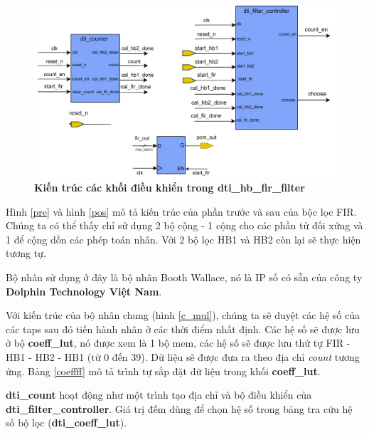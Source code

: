 \begin{figure}[H]
    \centering
    \includegraphics[width=13cm]{Images/Chuong4/hb_fir/fir.png}
    \caption[Kiến trúc các khối điều khiển trong dti\_hb\_fir\_filter]{\bfseries \fontsize{12pt}{0pt}\selectfont Kiến trúc các khối điều khiển trong dti\_hb\_fir\_filter}
    \label{control}
\end{figure}

Hình \ref{pre} và hình \ref{pos} mô tả kiến trúc của phần trước và sau của bộc lọc FIR. Chúng ta có thể thấy chỉ sử dụng 2 bộ cộng - 1 cộng cho các phần tử đối xứng và 1 để cộng dồn các phép toán nhân. Với 2 bộ lọc HB1 và HB2 còn lại sẽ thực hiện tương tự.

Bộ nhân sử dụng ở đây là bộ nhân Booth Wallace, nó là IP số có sẵn của công ty \textbf{Dolphin Technology Việt Nam}.

Với kiến trúc của bộ nhân chung (hình \ref{c_mul}), chúng ta sẽ duyệt các hệ số của các taps sau đó tiến hành nhân ở các thời điểm nhất định. Các hệ số sẽ được lưu ở bộ \textbf{coeff\_lut}, nó được xem là 1 bộ mem, các hệ số sẽ được lưu thứ tự FIR - HB1 - HB2 - HB1 (từ 0 đến 39). Dữ liệu sẽ được đưa ra theo địa chỉ \textit{count} tương ứng. Bảng \ref{coeffff} mô tả trình tự sắp đặt dữ liệu trong khối \textbf{coeff\_lut}.

\textbf{dti\_count} hoạt động như một trình tạo địa chỉ và bộ điều khiển của \textbf{dti\_filter\_controller}. Giá trị đếm dùng để chọn hệ số trong bảng tra cứu hệ số bộ lọc (\textbf{dti\_coeff\_lut}).

